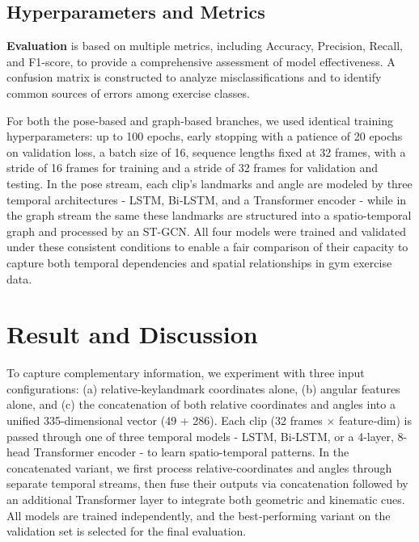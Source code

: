 \documentclass[runningheads]{llncs}
\begin{document}
\subsection{Hyperparameters and Metrics}

\textbf{Evaluation} is based on multiple metrics, including Accuracy, Precision, Recall, and F1-score, to provide a comprehensive assessment of model effectiveness. A confusion matrix is constructed to analyze misclassifications and to identify common sources of errors among exercise classes.

For both the pose‐based and graph‐based branches, we used identical training hyperparameters: up to 100 epochs, early stopping with a patience of 20 epochs on validation loss, a batch size of 16, sequence lengths fixed at 32 frames, with a stride of 16 frames for training and a stride of 32 frames for validation and testing. In the pose stream, each clip’s landmarks and angle are modeled by three temporal architectures - LSTM, Bi‐LSTM, and a Transformer encoder - while in the graph stream the same these landmarks are structured into a spatio-temporal graph and processed by an ST-GCN. All four models were trained and validated under these consistent conditions to enable a fair comparison of their capacity to capture both temporal dependencies and spatial relationships in gym exercise data.

\section{Result and Discussion}

To capture complementary information, we experiment with three input configurations: (a) relative‐keylandmark coordinates alone, (b) angular features alone, and (c) the concatenation of both relative coordinates and angles into a unified 335-dimensional vector (49 + 286). Each clip (32 frames × feature‐dim) is passed through one of three temporal models - LSTM, Bi-LSTM, or a 4-layer, 8-head Transformer encoder - to learn spatio-temporal patterns. In the concatenated variant, we first process relative‐coordinates and angles through separate temporal streams, then fuse their outputs via concatenation followed by an additional Transformer layer to integrate both geometric and kinematic cues. All models are trained independently, and the best‐performing variant on the validation set is selected for the final evaluation.
\end{document}

